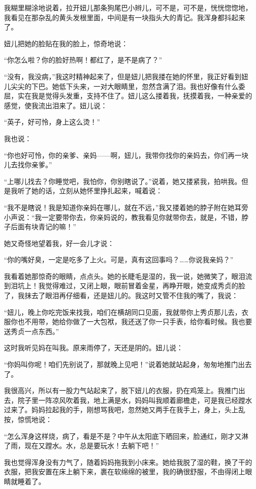 \par 我糊里糊涂地说着，拉开妞儿那条狗尾巴小辫儿，可不是，可不是，恍恍惚惚地，我看见在那杂乱的黄头发根里面，中间是有一块指头大的青记。我浑身都抖起来了。
\par 妞儿把她的脸贴在我的脸上，惊奇地说：
\par “你怎么啦？你的脸好热啊！都红了，是不是病了？”
\par “没有，我没病，”我这时精神起来了，但是妞儿把我搂在她的怀里，我正好看到妞儿尖尖的下巴。她低下头来，一对大眼睛里，忽然含满了泪。我也好像有什么委屈，实在我是觉得头发重，支持不住了。妞儿这么搂着我，抚摸着我，一种亲爱的感觉，使我流出泪来了。妞儿说：
\par “英子，好可怜，身上这么烫！”
\par 我也说：
\par “你也好可怜，你的亲爹、亲妈——啊，妞儿，我带你找你的亲妈去，你们再一块儿去找你亲爹。”
\par “上哪儿找去？你睡觉吧，我怕你，你别瞎说了。”说着，她又搂紧我，拍哄我。但是我听了她的话，立刻从她怀里挣扎起来，喊着说：
\par “我不是瞎说！我是知道你亲妈在哪儿，就在不远，”我又搂着她的脖子附在她耳旁小声说：“我一定要带你去，你亲妈说的，教我看见你就带你去，就是，不错，脖子后面有块青记的嘛！”
\par 她又奇怪地望着我，好一会儿才说：
\par “你的嘴好臭，一定是吃多了上火。可是，真有这回事吗？……你说我亲妈？”
\par 我看着她那惊奇的眼睛，点点头。她的长睫毛是湿的，我一说，她微笑了，眼泪流到泪坑上！我觉得难过，又闭上眼，眼前冒着金星，再睁开眼，她变成秀贞的脸了，我抹去了眼泪再仔细看，还是妞儿的。我这时又管不住我的嘴了，我说：
\par “妞儿，晚上你吃完饭来找我，咱们在横胡同口见面，我就带你上秀贞那儿去，衣服你也不用带，她给你做了一大包袱，我还送了你一只手表，给你看时候。我也要送秀贞一点东西。”
\par 这时我听见妈在叫我。原来雨停了，天还是阴的。妞儿说：
\par “你妈叫你呢！咱们先别说了，那就晚上见吧！”说着她就站起身，匆匆地推门出去了。
\par 我很高兴，所以有一股力气站起来了，脱下妞儿的衣服，扔在鸡笼上。我推门出去，院子里一阵凉风吹着我，地上满是水，妈妈叫我顺着廊檐走，可是我已经蹚水过来了。妈妈拉起我的手，刚想骂我吧，忽然她又两手在我手上，身上，头上乱按，惊慌地说：
\par “怎么浑身这样烧，病了，看是不是？中午从太阳底下晒回来，脸通红，刚才又淋了雨，现在又蹚水。水，总是要玩水！去躺下吧！”
\par 我也觉得浑身没有力气了，随着妈妈拖我到小床来。她给我脱了湿的鞋，换了干的衣服，把我安置在床上躺下来，裹在软绵绵的被里，我的确很舒服，不由得闭上眼睛就睡着了。
